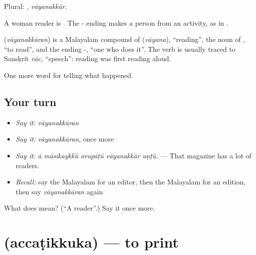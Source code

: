 Plural: , \emph{vāyanakkār}.

A woman reader is . The - ending makes a person from an activity, as in .

\begin{cousinweb}
\textbf{} (\emph{vāyanakkāran}) is a Malayalam compound of  (\emph{vāyana}), \textquotedblleft{}reading\textquotedblright{}, the noun of , \textquotedblleft{}to read\textquotedblright{}, and the ending -, \textquotedblleft{}one who does it\textquotedblright{}. The verb is usually traced to Sanskrit \emph{vāc}, \textquotedblleft{}speech\textquotedblright{}: reading was first reading aloud.
\end{cousinweb}

\begin{grammarlens}[title={What you've built}]
One more word for telling what happened.
\end{grammarlens}

\subsection*{Your turn}
\begin{itemize}
\raggedright
  \item \emph{Say it:} \emph{vāyanakkāran}
  \item \emph{Say it:} \emph{vāyanakkāran}, once more
  \item \emph{Say it:} \emph{ā māsikaykkŭ orupāṭŭ vāyanakkār uṇṭŭ.} — That magazine has a lot of readers.
  \item \emph{Recall:} say the Malayalam for an editor, then the Malayalam for an edition, then say \emph{vāyanakkāran} again
\end{itemize}

\begin{tcolorbox}[breakable,colback=teal!4,colframe=teal!35!black,title={Before you move on}]
What does  mean? (\textquotedblleft{}A reader\textquotedblright{}.) Say it once more.
\end{tcolorbox}
\section[\texorpdfstring{\ml{അച്ചടിക്കുക} (accaṭikkuka)}{അച്ചടിക്കുക (accaṭikkuka)}]{ (accaṭikkuka) — to print}

\label{lesson:ML-C350-accatikkuka}



